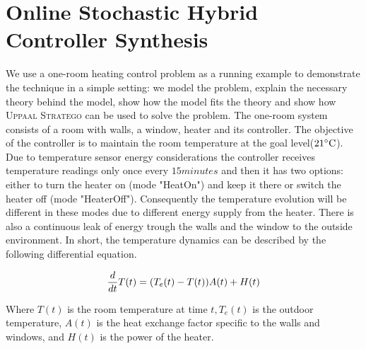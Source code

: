   \section{Online Stochastic Hybrid Controller Synthesis}
    \label{sec:onlinestochastichybridcontroller}
    We use a one-room heating control problem as a running example to 
    demonstrate the technique
    in a simple setting: we model the problem, explain the necessary theory 
    behind the model, show how the model fits the theory and show how 
    \textsc{Uppaal Stratego} can be used to solve the problem.
    The one-room system consists of a room with walls, a window, heater 
    and its controller. The objective of the controller is to maintain 
    the room temperature at the goal level($21 \celsius$). Due to temperature
    sensor energy considerations the controller receives temperature
    readings only once every $15 minutes$ and then it has two options:
    either to turn the heater on (mode "HeatOn") and keep it there or 
    switch the heater off (mode "HeaterOff"). Consequently the temperature 
    evolution will be different in these modes due to different energy 
    supply from the heater. There is also a continuous leak of energy 
    trough the walls and the window to the outside environment. In 
    short, the temperature dynamics can be described by the following 
    differential equation.

    \begin{equation}
        \frac{d}{dt}T(t) = (T_e(t)-T(t))A(t)+H(t) \\
    \end{equation}

    Where $T(t)$ is the room temperature at time $t,T_e(t)$ is the 
    outdoor temperature, $A(t)$ is the heat exchange factor specific 
    to the walls and windows, and $H(t)$ is the power of the heater.
  
